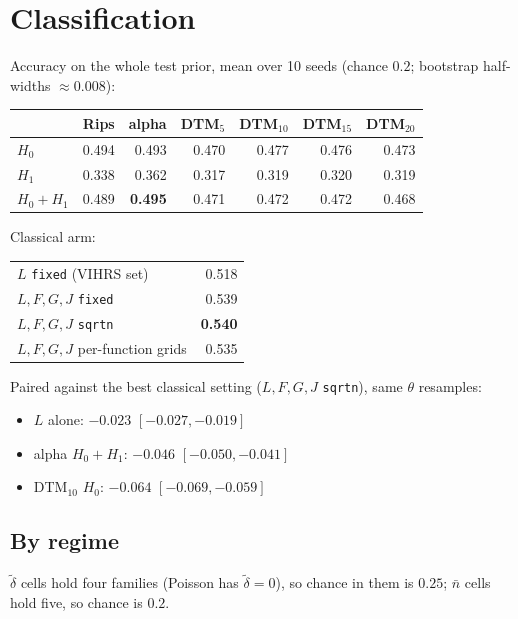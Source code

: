 \documentclass[11pt]{article}
\newcommand{\dt}{\tilde\delta}
\newcommand{\nb}{\bar n}
\begin{document}
\section{Classification}

Accuracy on the whole test prior, mean over 10 seeds (chance $0.2$; bootstrap half-widths $\approx0.008$):

\smallskip
\begin{tabular}{@{}lrrrrrr@{}}
\toprule
 & Rips & alpha & DTM$_5$ & DTM$_{10}$ & DTM$_{15}$ & DTM$_{20}$ \\
\midrule
$H_0$       & 0.494 & 0.493 & 0.470 & 0.477 & 0.476 & 0.473 \\
$H_1$       & 0.338 & 0.362 & 0.317 & 0.319 & 0.320 & 0.319 \\
$H_0{+}H_1$ & 0.489 & \textbf{0.495} & 0.471 & 0.472 & 0.472 & 0.468 \\
\bottomrule
\end{tabular}

\smallskip
Classical arm:

\smallskip
\begin{tabular}{@{}lr@{}}
\toprule
$L$ \texttt{fixed} (VIHRS set)       & 0.518 \\
$L,F,G,J$ \texttt{fixed}             & 0.539 \\
$L,F,G,J$ \texttt{sqrtn}             & \textbf{0.540} \\
$L,F,G,J$ per-function grids         & 0.535 \\
\bottomrule
\end{tabular}

\smallskip
Paired against the best classical setting ($L,F,G,J$ \texttt{sqrtn}), same $\theta$ resamples:
\begin{itemize}
  \item $L$ alone: $-0.023$ $[-0.027,-0.019]$
  \item alpha $H_0{+}H_1$: $-0.046$ $[-0.050,-0.041]$
  \item DTM$_{10}$ $H_0$: $-0.064$ $[-0.069,-0.059]$
\end{itemize}

\subsection*{By regime}
$\dt$ cells hold four families (Poisson has $\dt=0$), so chance in them is $0.25$; $\nb$ cells hold five, so chance is $0.2$.
\end{document}
